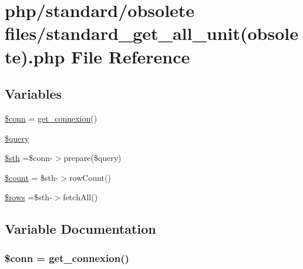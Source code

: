 \hypertarget{standard__get__all__unit_07obsolete_08_8php}{\section{php/standard/obsolete files/standard\-\_\-get\-\_\-all\-\_\-unit(obsolete).php File Reference}
\label{standard__get__all__unit_07obsolete_08_8php}
}
\subsection*{Variables}
\begin{DoxyCompactItemize}
\item 
\hyperlink{standard__get__all__unit_07obsolete_08_8php_aa8a5a87b9c1a6a0819b88447cbe41877}{\$conn} = \hyperlink{php__functions_8php_ace18bc10f3fd08f92688ac743e0d8c2e}{get\-\_\-connexion}()
\item 
\hyperlink{standard__get__all__unit_07obsolete_08_8php_af59a5f7cd609e592c41dc3643efd3c98}{\$query}
\item 
\hyperlink{standard__get__all__unit_07obsolete_08_8php_afa9126f9664959c02795be300a135f93}{\$sth} =\$conn-\/$>$prepare(\$query)
\item 
\hyperlink{standard__get__all__unit_07obsolete_08_8php_af789423037bbc89dc7c850e761177570}{\$count} = \$sth-\/$>$row\-Count()
\item 
\hyperlink{standard__get__all__unit_07obsolete_08_8php_ace2ec39e7df3899fa8df9640ec274b03}{\$rows} =\$sth-\/$>$fetch\-All()
\end{DoxyCompactItemize}


\subsection{Variable Documentation}
\hypertarget{standard__get__all__unit_07obsolete_08_8php_aa8a5a87b9c1a6a0819b88447cbe41877}{
\subsubsection[{\$conn}]{\setlength{\rightskip}{0pt plus 5cm}\$conn = {\bf get\-\_\-connexion}()}}\label{standard__get__all__unit_07obsolete_08_8php_aa8a5a87b9c1a6a0819b88447cbe41877}



